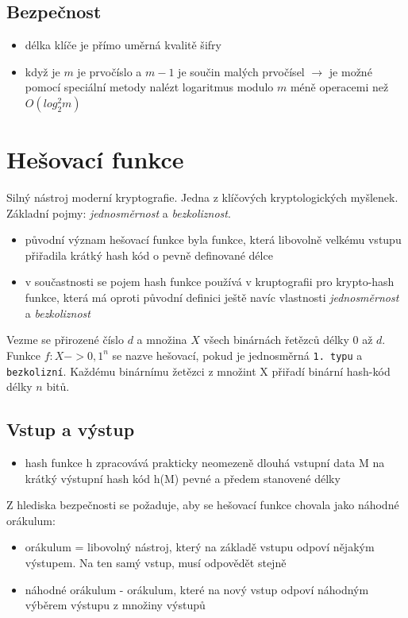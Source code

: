 \documentclass{szzclass}
\begin{document}
\subsection{Bezpečnost}
\begin{itemize}
    \item délka klíče je přímo uměrná kvalitě šifry
    \item když je $m$ je prvočíslo a $m-1$ je součin malých prvočísel $\rightarrow$ je možné pomocí speciální metody nalézt logaritmus modulo $m$ méně operacemi než $O(log^2_2m)$
\end{itemize}
\section{Hešovací funkce}
Silný nástroj moderní kryptografie. Jedna z klíčových kryptologických myšlenek. Základní pojmy: \textit{jednosměrnost} a \textit{bezkoliznost}.
\newline
\begin{itemize}
    \item původní význam hešovací funkce byla funkce, která libovolně velkému vstupu přiřadila krátký hash kód o pevně definované délce
    \item v součastnosti se pojem hash funkce používá v kruptografii pro krypto-hash funkce, která má oproti původní definici ještě navíc vlastnosti \textit{jednosměrnost} a \textit{bezkoliznost}
\end{itemize}
Vezme se přirozené číslo $d$ a množina $X$ všech binárnách řetězců délky 0 až $d$. Funkce $f: X -> {0, 1}^n$ se nazve hešovací,
pokud je jednosměrná \texttt{1. typu} a \texttt{bezkolizní}. Každému binárnímu žetězci z množint X přiřadí binární hash-kód délky $n$ bitů.
\subsection{Vstup a výstup}
\begin{itemize}
    \item hash funkce h zpracovává prakticky neomezeně dlouhá vstupní data M na krátký výstupní hash kód h(M) pevné a předem stanovené délky
\end{itemize}
Z hlediska bezpečnosti se požaduje, aby se hešovací funkce chovala jako náhodné orákulum:
\begin{itemize}
    \item orákulum = libovolný nástroj, který na základě vstupu odpoví nějakým výstupem. Na ten samý vstup, musí odpovědět stejně
    \item náhodné orákulum - orákulum, které na nový vstup odpoví náhodným výběrem výstupu z množiny výstupů
\end{itemize}
\end{document}
